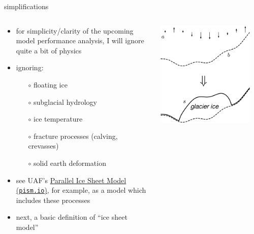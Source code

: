 \documentclass[svgnames,
               hyperref={colorlinks,citecolor=DeepPink4,linkcolor=FireBrick,urlcolor=Maroon},
               usepdftitle=false]  %
               {beamer}
\begin{document}
\begin{frame}{simplifications}

\begin{columns}
\begin{column}{0.6\textwidth}
\begin{itemize}
\item for simplicity/clarity of the upcoming model performance analysis, I will ignore quite a bit of physics
\item \alert{ignoring}:
    \begin{itemize}
    \item[$\circ$] floating ice
    \item[$\circ$] subglacial hydrology
    \item[$\circ$] ice temperature
    \item[$\circ$] fracture processes (calving, crevasses)
    \item[$\circ$] solid earth deformation
    \end{itemize}

\medskip
\item<2> {\footnotesize see UAF's \href{https://pism.io/}{Parallel Ice Sheet Model (\texttt{pism.io})}, for example, as a model which includes these processes}
\item<2> {\footnotesize next, a basic definition of ``ice sheet model''}
\end{itemize}
\end{column}
\begin{column}{0.42\textwidth}
\hfill \includegraphics[width=0.9\textwidth]{images/map-glacier-ice.png}
\end{column}
\end{columns}
\end{frame}
\end{document}
